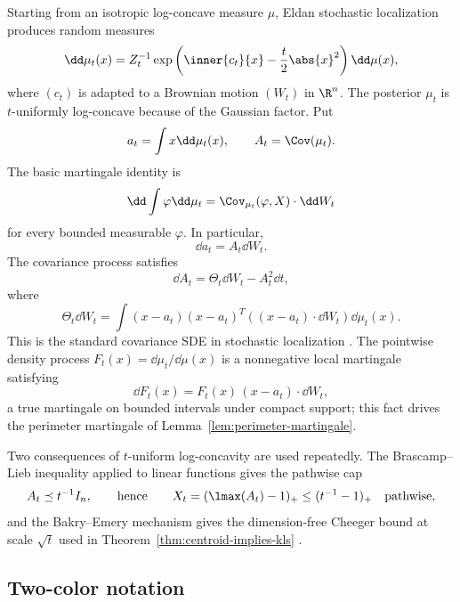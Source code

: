 \documentclass[../../main.tex]{subfiles}
\begin{document}
Starting from an isotropic log-concave measure $\mu$, Eldan stochastic localization produces random
measures
\begin{equation}\label{eq:loc-density}
  \dd\mu_t(x)=Z_t^{-1}\exp\left(\inner{c_t}{x}-\frac t2\abs{x}^2\right)\dd\mu(x),
\end{equation}
where $(c_t)$ is adapted to a Brownian motion $(W_t)$ in $\R^n$. The posterior $\mu_t$ is
$t$-uniformly log-concave because of the Gaussian factor. Put
\[
  a_t=\int x\dd\mu_t(x),\qquad A_t=\Cov(\mu_t).
\]
The basic martingale identity is
\begin{equation}\label{eq:loc-martingale}
  \dd\int\varphi\dd\mu_t
  =\Cov_{\mu_t}(\varphi,X)\cdot\dd W_t
\end{equation}
for every bounded measurable $\varphi$. In particular,
\begin{equation}\label{eq:mean-sde}
  \dd a_t=A_t\dd W_t .
\end{equation}
The covariance process satisfies
\begin{equation}\label{eq:cov-sde}
  \dd A_t=\Theta_t\dd W_t-A_t^2\dd t,
\end{equation}
where
\[
  \Theta_t\dd W_t
  =\int (x-a_t)(x-a_t)^T((x-a_t)\cdot\dd W_t)\dd\mu_t(x).
\]
This is the standard covariance SDE in stochastic localization \cite{Eldan2013ThinShell,LeeVempala2024}.
The pointwise density process $F_t(x)=\dd\mu_t/\dd\mu(x)$ is a nonnegative local martingale
satisfying
\begin{equation}\label{eq:density-sde}
  \dd F_t(x)=F_t(x)\,(x-a_t)\cdot\dd W_t ,
\end{equation}
a true martingale on bounded intervals under compact support; this fact drives the perimeter
martingale of Lemma~\ref{lem:perimeter-martingale}.

Two consequences of $t$-uniform log-concavity are used repeatedly. The Brascamp--Lieb inequality
applied to linear functions gives the pathwise cap
\begin{equation}\label{eq:BL-cap}
  A_t\preceq t^{-1}I_n,
  \qquad\text{hence}\qquad
  X_t=(\lmax(A_t)-1)_+\le(t^{-1}-1)_+\quad\text{pathwise},
\end{equation}
and the Bakry--Emery mechanism gives the dimension-free Cheeger bound at scale $\sqrt t$ used in
Theorem~\ref{thm:centroid-implies-kls} \cite{BrascampLieb1976,BakryGentilLedoux2014}.

\subsection{Two-color notation}
\label{subsec:two-color-notation}
\end{document}

